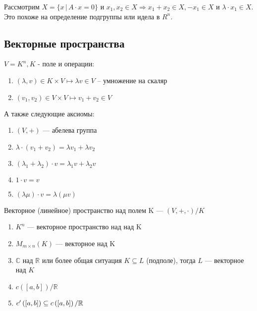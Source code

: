 \begin{remark} 
    Рассмотрим $X = \{ x \, | \, A \cdot x = 0 \}$ и $x_1, x_2 \in X \Longrightarrow x_1 + x_2 \in X, -x_1 \in X $ и $\lambda \cdot x_1 \in X$. Это похоже на определение подгруппы или идела в $R^n$.
\end{remark}

\subsection{Векторные пространства}

\begin{definition}
    
    \quad $V = K^n, K$ - поле и операции:
    \begin{enumerate}
        \item $ (\lambda, v) \in K \times V \mapsto \lambda v \in V$ -- умножение на скаляр
        \item $(v_1, v_2) \in V \times V \mapsto v_1 + v_2 \in V$
    \end{enumerate} 
    \quad А также следующие аксиомы:
    \begin{enumerate}
        \item $(V, +)$ --- абелева группа
        \item $\lambda \cdot (v_1 + v_2) = \lambda v_1 + \lambda v_2$
        \item $(\lambda_1 + \lambda_2) \cdot v = \lambda_1 v + \lambda_2 v$
        \item $1 \cdot v = v$
        \item $(\lambda \mu)\cdot v = \lambda (\mu v)$
    \end{enumerate}
\quad Векторное (линейное) пространство над полем K --- $(V, +, \cdot) / K$
\end{definition}

\quad 

\begin{examples}
    \begin{enumerate}
        \item $K^n$ --- векторное пространство над над K 
        \item $M_{m \times n}(K)$ --- векторное над K
        \item $\mathbb{C}$ над $\mathbb{R}$ или более общая ситуация $K \subseteq L$ (подполе), тогда  $L$ --- векторное над $K$
        \item $c([a,b]) / \mathbb{R}$
        \item $c'\left([a,b]\right) \subseteq c\left([a,b]\right) / \mathbb{R}$
    \end{enumerate}
    
\end{examples}

